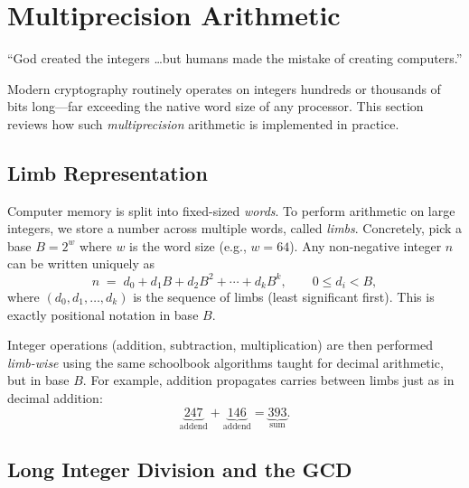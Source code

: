 \documentclass[11pt]{article}
\theoremstyle{plain}
\theoremstyle{definition}
\begin{document}
\section{Multiprecision Arithmetic}

\begin{tcolorbox}[colback=gray!8, colframe=gray!50, title=Motivating quote]
``God created the integers \ldots but humans made the mistake of
creating computers.''
\end{tcolorbox}

Modern cryptography routinely operates on integers hundreds or
thousands of bits long---far exceeding the native word size of any
processor.  This section reviews how such \emph{multiprecision}
arithmetic is implemented in practice.

\subsection{Limb Representation}

Computer memory is split into fixed-sized \emph{words}.  To perform
arithmetic on large integers, we store a number across multiple words,
called \emph{limbs}.  Concretely, pick a base $B = 2^w$ where $w$ is
the word size (e.g., $w = 64$).  Any non-negative integer $n$ can be
written uniquely as
\[
  n \;=\; d_0 + d_1 B + d_2 B^2 + \cdots + d_k B^k,
  \qquad 0 \le d_i < B,
\]
where $(d_0, d_1, \ldots, d_k)$ is the sequence of limbs (least
significant first).  This is exactly positional notation in base $B$.

Integer operations (addition, subtraction, multiplication) are then
performed \emph{limb-wise} using the same schoolbook algorithms taught
for decimal arithmetic, but in base $B$.  For example, addition
propagates carries between limbs just as in decimal addition:
\[
  \underbrace{247}_{\text{addend}} +
  \underbrace{146}_{\text{addend}} =
  \underbrace{393}_{\text{sum}}.
\]

\subsection{Long Integer Division and the GCD}
\end{document}
